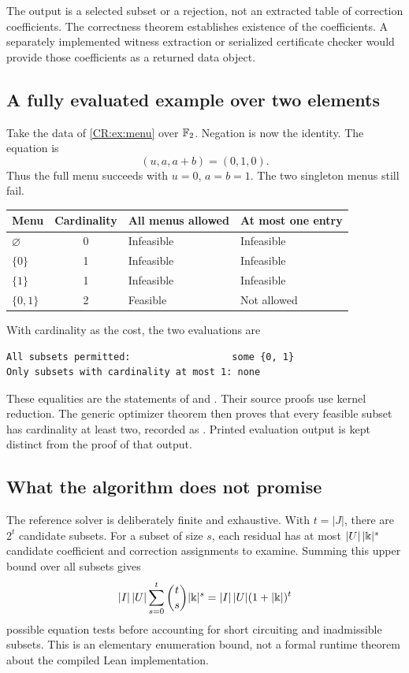 The output is a selected subset or a rejection, not an extracted table of correction coefficients. The correctness theorem establishes existence of the coefficients. A separately implemented witness extraction or serialized certificate checker would provide those coefficients as a returned data object.

\subsection{A fully evaluated example over two elements}\label{CR:sec:f2}
Take the data of \cref{CR:ex:menu} over $\mathbb{F}_2$. Negation is now the identity. The equation is
\[
(u,a,a+b)=(0,1,0).
\]
Thus the full menu succeeds with $u=0$, $a=b=1$. The two singleton menus still fail.

\begin{center}
\begin{tabular}{@{}lcll@{}}
\toprule
Menu & Cardinality & All menus allowed & At most one entry\\
\midrule
$\varnothing$ & 0 & Infeasible & Infeasible\\
$\{0\}$ & 1 & Infeasible & Infeasible\\
$\{1\}$ & 1 & Infeasible & Infeasible\\
$\{0,1\}$ & 2 & Feasible & Not allowed\\
\bottomrule
\end{tabular}
\end{center}

With cardinality as the cost, the two evaluations are
\begin{Verbatim}[fontsize=\small,frame=single,framesep=8pt,rulecolor=\color{RuleGray}]
All subsets permitted:                  some {0, 1}
Only subsets with cardinality at most 1: none
\end{Verbatim}
These equalities are the statements of
 and
. Their source proofs use kernel reduction. The generic optimizer theorem then proves that every feasible subset has cardinality at least two, recorded as . Printed evaluation output is kept distinct from the proof of that output.

\subsection{What the algorithm does not promise}
The reference solver is deliberately finite and exhaustive. With $t=|J|$, there are $2^t$ candidate subsets. For a subset of size $s$, each residual has at most $|U|\,|\Bbbk|^s$ candidate coefficient and correction assignments to examine. Summing this upper bound over all subsets gives
\[
|I|\,|U|\sum_{s=0}^t\binom ts|\Bbbk|^s
=|I|\,|U|(1+|\Bbbk|)^t
\]
possible equation tests before accounting for short circuiting and inadmissible subsets. This is an elementary enumeration bound, not a formal runtime theorem about the compiled Lean implementation.

